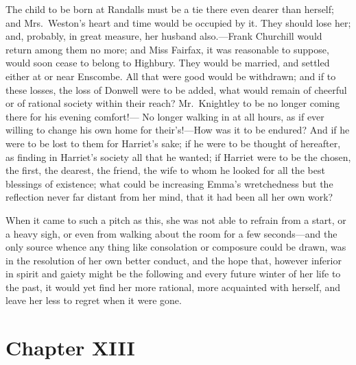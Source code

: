The child to be born at Randalls must be a tie there even dearer
than herself; and Mrs.\ Weston's heart and time would be occupied
by it.  They should lose her; and, probably, in great measure,
her husband also.---Frank Churchill would return among them no more;
and Miss Fairfax, it was reasonable to suppose, would soon cease
to belong to Highbury.  They would be married, and settled either
at or near Enscombe.  All that were good would be withdrawn; and if
to these losses, the loss of Donwell were to be added, what would
remain of cheerful or of rational society within their reach?
Mr.\ Knightley to be no longer coming there for his evening comfort!---%
No longer walking in at all hours, as if ever willing to change
his own home for their's!---How was it to be endured?  And if he were
to be lost to them for Harriet's sake; if he were to be thought
of hereafter, as finding in Harriet's society all that he wanted;
if Harriet were to be the chosen, the first, the dearest, the friend,
the wife to whom he looked for all the best blessings of existence;
what could be increasing Emma's wretchedness but the reflection never far
distant from her mind, that it had been all her own work?

When it came to such a pitch as this, she was not able to refrain
from a start, or a heavy sigh, or even from walking about the room
for a few seconds---and the only source whence any thing like consolation
or composure could be drawn, was in the resolution of her own
better conduct, and the hope that, however inferior in spirit and
gaiety might be the following and every future winter of her life
to the past, it would yet find her more rational, more acquainted
with herself, and leave her less to regret when it were gone.



\chapter{Chapter XIII}


